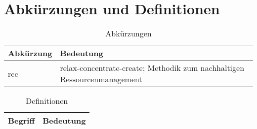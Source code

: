 
\section{Abkürzungen und Definitionen}\label{sec:abk_rzungen_}

\begin{table}[htpb]
  \centering
  \caption{Abkürzungen}
\label{tab:abkuerzungen}
\begin{tabularx}{\textwidth}{@{} l X @{}}
  \toprule
   Abkürzung & Bedeutung \\
  \midrule
  rcc & relax-concentrate-create; Methodik zum nachhaltigen Ressourcenmanagement \\

  \bottomrule
  \end{tabularx}
\end{table}


\begin{table}[htpb]
  \centering
  \caption{Definitionen}
\label{tab:definitionen}
\begin{tabularx}{\textwidth}{@{} X X @{}}
  \toprule
   Begriff & Bedeutung \\
  \midrule

  \bottomrule
  \end{tabularx}
\end{table}


